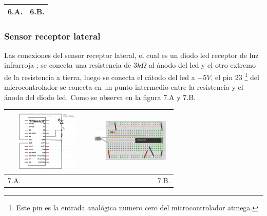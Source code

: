 \documentclass[12]{article}
\newenvironment{Figure}
{\par\medskip\noindent\minipage{\linewidth}}
{\endminipage\par\medskip}
\begin{document}
\begin{multicols}{2}
\begin{Figure}
\begin{tabular}{|l|r|}
6.A. & 6.B. \\ \hline
\end{tabular}
\label{fig:g6}
\end{Figure}
\subsubsection{Sensor receptor lateral}
Las conexiones del sensor receptor lateral, el cual es un diodo led receptor de luz infrarroja \cite{INFRARED}; se conecta una resistencia de $3 k\Omega$ al ánodo del led y el otro extremo de la resistencia a tierra, luego se conecta el cátodo del led a $+5V$, el pin 23 \footnote{Este pin es la entrada analógica numero cero del microcontrolador atmega.} del microcontrolador se conecta  en un punto intermedio entre la resistencia y el ánodo del diodo led. Como se observa en la figura 7.A y 7.B.
\begin{Figure}
\center
\begin{tabular}{|l|r|}
\hline
\includegraphics[width=4cm, height=3cm]{img/senlaesq.png} & \includegraphics[width=4cm, height=3cm]{img/senlapro.png} \\ \hline
7.A. & 7.B. \\ \hline
\end{tabular}
\label{fig:g7}
\end{Figure}

\end{multicols}
\end{document}

